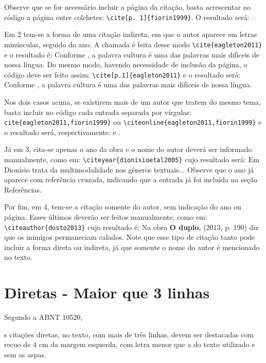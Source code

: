 \documentclass[a4paper,12pt,oneside]{memoir}
\begin{document}
Observe que se for necessário incluir a página da citação, basta acrescentar no código a página entre colchetes: \verb|\cite[p. 1]{fiorin1999}|. O resultado será:  \cite[p.1]{fiorin1999}.

Em 2 tem-se a forma de uma citação indireta, em que o autor aparece em letras minúsculas, seguido do ano. A chamada é feita desse modo \verb|\cite{eagleton2011}| e o resultado é: Conforme , a palavra cultura é uma das palavras mais difíceis de nossa língua. Do mesmo modo, havendo necessidade de inclusão da página, o código deve ser feito assim: \verb|\cite[p.1]{eagleton2011}| e o resultado será: Conforme , a palavra cultura é uma das palavras mais difíceis de nossa língua.

Nos dois casos acima, se existirem mais de um autor que tratem do mesmo tema, basta incluir no código cada entrada separada por vírgulas: \verb|cite{eagleton2011,fiorin1999}| ou \verb|\citeonline{eagleton2011,fiorin1999}| e o resultado será, respectivamente: \cite{eagleton2011,fiorin1999} e . 

Já em 3, cita-se apenas o ano da obra e o nome do autor deverá ser informado manualmente, como em: \verb|\citeyear{dionisioetal2005}| cujo resultado será: Em \citeyear{dionisioetal2005} Dionísio trata da multimodalidade nos gêneros textuais... Observe que o ano já aparece com referência cruzada, indicando que a entrada já foi incluída na seção Referências.

Por fim, em 4, tem-se a citação somente do autor, sem indicação do ano ou página. Esses últimos deverão ser feitos manualmente, como em: \verb|\citeauthor{dosto2013}| cujo resultado é: Na obra \textbf{O duplo}, \citeauthor{dosto2013} (2013, p. 190) diz que os inimigos permaneciam calados. Note que esse tipo de citação tanto pode incluir a forma direta ou indireta, já que somente o nome do autor é mencionado no texto.

 \section{Diretas - Maior que 3 linhas}

 Segundo a ABNT 10520,

\begin{citar}
[a]s citações diretas, no texto, com mais de três linhas, devem ser destacadas com recuo de 4 cm da margem esquerda, com letra menor que a do texto utilizado e sem as aspas. \cite[p. 2]{abnt10520}
\end{citar}
\end{document}
